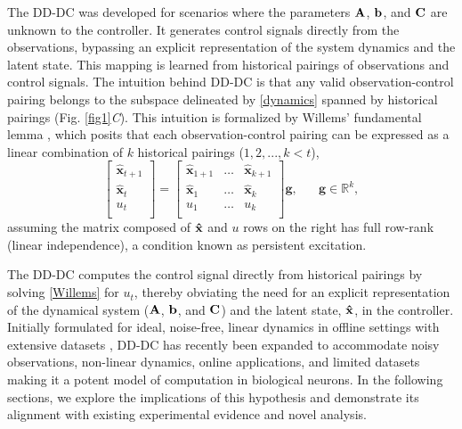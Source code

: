 \documentclass[9pt,twocolumn,twoside]{pnas-new}
\begin{document}
The DD-DC was developed for scenarios where the parameters $\bf A$, $\bf b$, and  $\bf C$ are unknown to the controller. It generates control signals directly from the observations, bypassing an explicit representation of the system dynamics and the latent state. This mapping is learned from historical pairings of observations and control signals. The intuition behind DD-DC is that any valid observation-control pairing belongs to the subspace delineated by \eqref{dynamics} spanned by historical pairings (Fig. \ref{fig1}{\it C}). This intuition is formalized by Willems' fundamental lemma \citep{willems2005note}, which posits that each observation-control pairing can be expressed as a linear combination of $k$ historical pairings ($1, 2, ..., k<t$),
\begin{equation}
\label{Willems}
\begin{bmatrix} \mathbf{\hat{x}}_{t+1}\\  \mathbf{\hat{x}}_t\\ u_t\\\end{bmatrix}=\begin{bmatrix} \mathbf{\hat{x}}_{1+1} & \hdots & \mathbf{\hat{x}}_{k+1} \\  \mathbf{\hat{x}}_1 & \hdots & \mathbf{\hat{x}}_k\\ u_1 & \hdots & u_k\\\end{bmatrix} \mathbf{g},  \;\;\;\;\;\; \mathbf{g}\in\mathbb{R}^k,
\end{equation}
assuming the matrix composed of $\bf \hat{x}$ and $u$ rows on the right has full row-rank (linear independence), a condition known as persistent excitation.

The DD-DC computes the control signal directly from historical pairings by solving \eqref{Willems} for $u_t$, thereby obviating the need for an explicit representation of the dynamical system ($\bf A$, $\bf b$, and $\bf C$) and  the latent state, ${\bf \hat{x}}$, in the controller. Initially formulated for ideal, noise-free, linear dynamics in offline settings with extensive datasets \citep{willems2005note}, DD-DC has recently been expanded to accommodate noisy observations, non-linear dynamics, online applications, and limited datasets \citep{coulson2019data,berberich2022linear,van2021beyond,rotulo2022online,markovsky2022data} making it a potent model of computation in biological neurons. In the following sections, we explore the implications of this hypothesis and demonstrate its alignment with existing experimental evidence and novel analysis.
 
\end{document}

